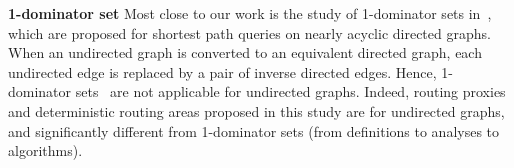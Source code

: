 \smallskip\noindent\textbf{1-dominator set} Most close to our work is the study of 1-dominator sets in~\cite{SaundersT07}, which are proposed for shortest path queries on nearly acyclic directed graphs. When an undirected graph is converted to an equivalent directed graph, each undirected edge is replaced by a pair of inverse directed edges. Hence, 1-dominator sets~\cite{SaundersT07} are not applicable for undirected graphs. Indeed, routing proxies and deterministic routing areas proposed in this study  are for undirected graphs,  and  significantly different from 1-dominator sets (from definitions to analyses to algorithms).







